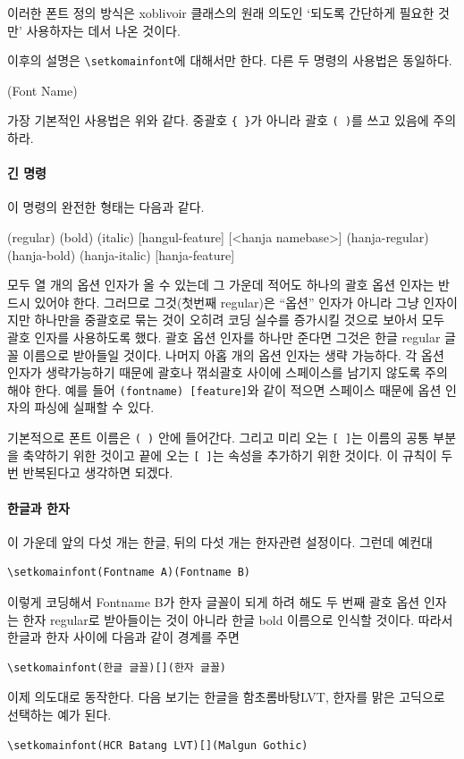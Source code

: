 \documentclass[
	12pt,
	a4paper,
	kosection,
	footnote,
	nobookmarks,
	microtype,
	figtabcapt,
]{oblivoir}
\def\xetexko{\XeTeX-\ko}
\begin{document}
이러한 폰트 정의 방식은 xoblivoir 클래스의 원래 의도인 `되도록 간단하게
필요한 것만' 사용하자는 데서 나온 것이다.

이후의 설명은 \verb|\setkomainfont|에 대해서만 한다. 다른 두 명령의 사용법은 동일하다.
\begin{boxedverbatim}
\setkomainfont(Font Name)
\end{boxedverbatim}
가장 기본적인 사용법은 위와 같다. 중괄호 \verb|{ }|가 아니라 괄호 \verb|( )|를 쓰고 있음에 주의하라.

\paragraph{긴 명령}
이 명령의 완전한 형태는 다음과 같다.
\begin{boxedverbatim}
\setkomainfont[<namebase>]%
              (regular)%
              (bold)%
              (italic)%
              [hangul-feature]%
              [<hanja namebase>]%
              (hanja-regular)%
              (hanja-bold)%
              (hanja-italic)%
              [hanja-feature]
\end{boxedverbatim}
모두 열 개의 옵션 인자가 올 수 있는데 그 가운데 적어도 하나의 괄호 옵션 인자는 반드시 있어야 한다.
그러므로 그것(첫번째 regular)은 ``옵션'' 인자가 아니라 그냥 인자이지만 하나만을 중괄호로 묶는 것이 오히려 코딩 
실수를 증가시킬 것으로 보아서 모두 괄호 인자를 사용하도록 했다.
괄호 옵션 인자를 하나만 준다면 그것은 한글 regular 글꼴 이름으로 받아들일 것이다.
나머지 아홉 개의 옵션 인자는 생략 가능하다. 각 옵션 인자가 생략가능하기 때문에
괄호나 꺾쇠괄호 사이에 스페이스를 남기지 않도록 주의해야 한다. 예를 들어 \verb*|(fontname) [feature]|와 같이 
적으면 스페이스 때문에 옵션 인자의 파싱에 실패할 수 있다.

기본적으로 폰트 이름은 \verb|( )| 안에 들어간다. 그리고 미리 오는 \verb|[ ]|는 이름의 공통 부분을 축약하기 위한 것이고 끝에 오는 \verb|[ ]|는 속성을 추가하기 위한 것이다. 이 규칙이 두 번 반복된다고 생각하면 되겠다.

\paragraph{한글과 한자}
이 가운데 앞의 다섯 개는 한글, 뒤의 다섯 개는 한자관련 설정이다. 그런데 예컨대
\begin{verbatim}
\setkomainfont(Fontname A)(Fontname B)
\end{verbatim}
이렇게 코딩해서 Fontname B가 한자 글꼴이 되게 하려 해도
두 번째 괄호 옵션 인자는 한자 regular로 받아들이는 것이 아니라
한글 bold 이름으로 인식할 것이다.
따라서 한글과 한자 사이에 다음과 같이 경계를 주면
\begin{verbatim}
\setkomainfont(한글 글꼴)[](한자 글꼴)
\end{verbatim}
이제 의도대로 동작한다. 다음 보기는 한글을 함초롬바탕LVT, 한자를 맑은 고딕으로 선택하는 예가 된다.
\begin{verbatim}
\setkomainfont(HCR Batang LVT)[](Malgun Gothic)
\end{verbatim}
\end{document}
